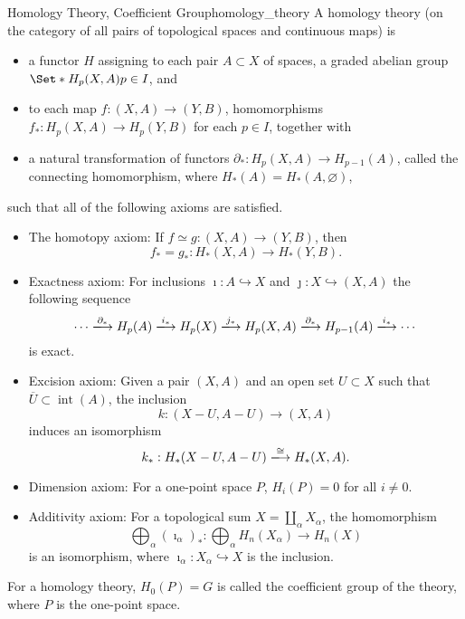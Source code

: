 \documentclass{article}
\begin{document}
\begin{definition}{Homology Theory, Coefficient Group}{homology_theory}
    A homology theory (on the category of all pairs of topological spaces and continuous maps) is
    \begin{itemize}
        \item a functor $H$ assigning to each pair $A\subset X$ of spaces, a graded abelian group $\Set*{H_p(X,A)}{p\in I}$, and
        \item to each map $f\colon (X,A) \to (Y,B)$, homomorphisms $f_*\colon H_p(X,A) \to H_p(Y,B)$ for each $p\in I$, together with
        \item a natural transformation of functors $\partial_*\colon H_p(X,A) \to H_{p-1}(A)$, called the connecting homomorphism, where $H_*(A) = H_*(A,\varnothing)$,
    \end{itemize}
    such that all of the following axioms are satisfied.
    \begin{itemize}
        \item The homotopy axiom: If $f\simeq g: (X,A) \rightarrow (Y,B)$, then
        \[ f_*=g_*: H_*(X,A) \rightarrow H_*(Y,B). \]
        \item Exactness axiom: For inclusions $\imath: A \hookrightarrow X$ and $\jmath: X \hookrightarrow (X,A)$ the following sequence
        \[ \cdots \xlongrightarrow{\partial_*} H_p(A) \xlongrightarrow{i_*} H_p(X) \xlongrightarrow{j_*} H_p(X,A) \xlongrightarrow{\partial_*} H_{p-1}(A) \xlongrightarrow{i_*} \cdots \]
        is exact.
        \item Excision axiom: Given a pair $(X,A)$ and an open set $U\subset X$ such that $\overline{U}\subset \operatorname{int}(A)$, the inclusion
        \[ k: (X-U,A-U) \rightarrow (X,A) \]
        induces an isomorphism
        \[ k_*: H_*(X-U,A-U) \xlongrightarrow{\cong} H_*(X,A). \]
        \item Dimension axiom: For a one-point space $P$, $H_i(P) = 0$ for all $i\neq 0$.
        \item Additivity axiom: For a topological sum $X = \coprod_\alpha X_\alpha$, the homomorphism
        \[ \bigoplus_\alpha(\imath_\alpha)_*: \bigoplus_\alpha H_n(X_\alpha) \rightarrow H_n(X) \]
        is an isomorphism, where $\imath_\alpha: X_\alpha \hookrightarrow X$ is the inclusion.
    \end{itemize}
    For a homology theory, $H_0(P) = G$ is called the coefficient group of the theory, where $P$ is the one-point space.
\end{definition}
\end{document}
